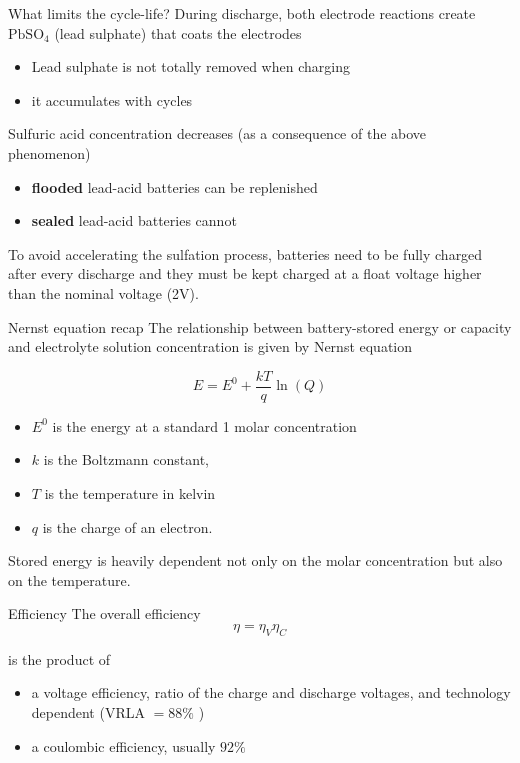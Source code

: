 \begin{frame}{What limits the cycle-life?}
During discharge, both electrode reactions create $\mathrm{PbSO}_4$ (lead sulphate) that coats the electrodes

\begin{itemize}
  \item Lead sulphate is not totally removed when charging
  \item it accumulates with cycles
\end{itemize}

Sulfuric acid concentration decreases (as a consequence of the above phenomenon)

\begin{itemize}
  \item \textbf{flooded} lead-acid batteries can be replenished
  \item \textbf{sealed} lead-acid batteries cannot
\end{itemize}

To avoid accelerating the sulfation process, batteries need to be fully charged after every discharge and they must be kept charged at a float voltage higher than the nominal voltage (2V).

\end{frame}\begin{frame}{Nernst equation recap}
The relationship between battery-stored energy or capacity and electrolyte solution concentration is given by Nernst equation

$$
E=E^{0}+\frac{k T}{q} \ln (Q)
$$

\begin{itemize}
  \item $E^{0}$ is the energy at a standard 1 molar concentration
  \item $k$ is the Boltzmann constant,
  \item $T$ is the temperature in kelvin
  \item $q$ is the charge of an electron.
\end{itemize}

Stored energy is heavily dependent not only on the molar concentration but also on the temperature.

\end{frame}\begin{frame}{Efficiency}
The overall efficiency
$$
\eta=\eta_{V} \eta_{C}
$$

is the product of
\begin{itemize}
  \item a voltage efficiency, ratio of the charge and discharge voltages, and technology dependent (VRLA $=88 \%$ )
  \item a coulombic efficiency, usually $92 \%$
\end{itemize}


\end{frame}
